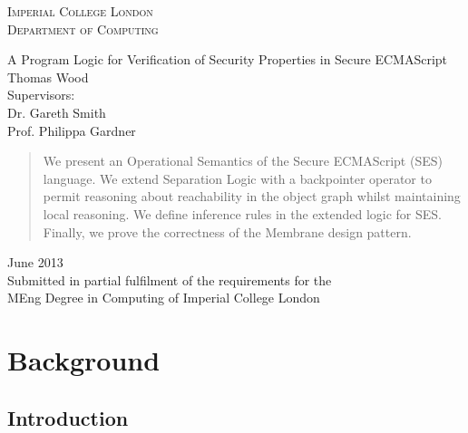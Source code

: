 \documentclass[a4paper,notitlepage]{report}
\begin{document}
\begin{titlepage}
\begin{center}
  \textsc{\Large Imperial College London} \\[0.1cm]
  \textsc{\Large Department of Computing}

  \vfill

  {\Huge A Program Logic for Verification of Security Properties in Secure
  ECMAScript} \\[1cm]

  {\LARGE Thomas Wood} \\[1cm]

  {\large Supervisors:\\
  Dr. Gareth Smith \\
  Prof. Philippa Gardner}
  \\[2cm]

  \begin{abstract}
    \begin{center}
      We present an Operational Semantics of the Secure ECMAScript (SES) language.
      We extend Separation Logic with a backpointer operator to permit reasoning
      about reachability in the object graph whilst maintaining local reasoning.
      We define inference rules in the extended logic for SES. Finally, we prove
      the correctness of the Membrane design pattern.
    \end{center}
  \end{abstract}

  \vfill

  {\Large June 2013} \\[0.5cm]

  Submitted in partial fulfilment of the requirements for the\\
  MEng Degree in Computing of Imperial College London
\end{center}
\end{titlepage}

%
%
%
%

\tableofcontents

\chapter{Background}
\section{Introduction}
\end{document}
